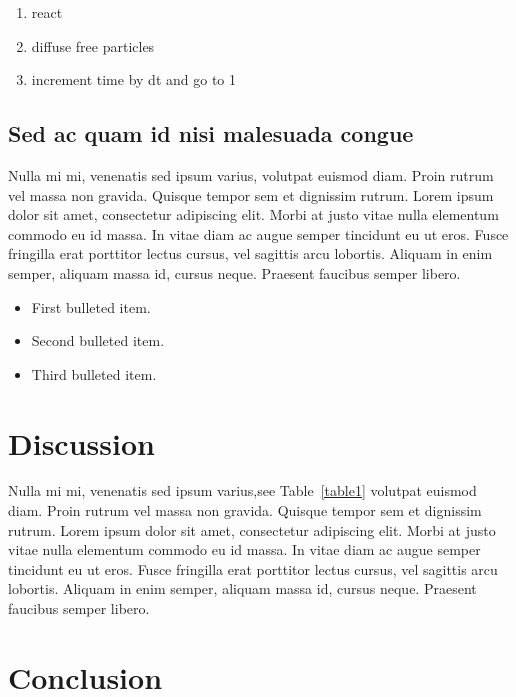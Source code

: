 \documentclass[
  10pt,
  letterpaper,
]{article}
\begin{document}
\begin{enumerate}
\def\labelenumi{\arabic{enumi}.}
\item
  react
\item
  diffuse free particles
\item
  increment time by dt and go to 1
\end{enumerate}

\hypertarget{sed-ac-quam-id-nisi-malesuada-congue}{%
\subsection{Sed ac quam id nisi malesuada
congue}\label{sed-ac-quam-id-nisi-malesuada-congue}}

Nulla mi mi, venenatis sed ipsum varius, volutpat euismod diam. Proin
rutrum vel massa non gravida. Quisque tempor sem et dignissim rutrum.
Lorem ipsum dolor sit amet, consectetur adipiscing elit. Morbi at justo
vitae nulla elementum commodo eu id massa. In vitae diam ac augue semper
tincidunt eu ut eros. Fusce fringilla erat porttitor lectus cursus, vel
sagittis arcu lobortis. Aliquam in enim semper, aliquam massa id, cursus
neque. Praesent faucibus semper libero.

\begin{itemize}
\item
  First bulleted item.
\item
  Second bulleted item.
\item
  Third bulleted item.
\end{itemize}

\hypertarget{discussion}{%
\section{Discussion}\label{discussion}}

Nulla mi mi, venenatis sed ipsum varius,see Table~\ref{table1} volutpat
euismod diam. Proin rutrum vel massa non gravida. Quisque tempor sem et
dignissim rutrum. Lorem ipsum dolor sit amet, consectetur adipiscing
elit. Morbi at justo vitae nulla elementum commodo eu id massa. In vitae
diam ac augue semper tincidunt eu ut eros. Fusce fringilla erat
porttitor lectus cursus, vel sagittis arcu lobortis. Aliquam in enim
semper, aliquam massa id, cursus neque. Praesent faucibus semper libero.

\hypertarget{conclusion}{%
\section{Conclusion}\label{conclusion}}
\end{document}
